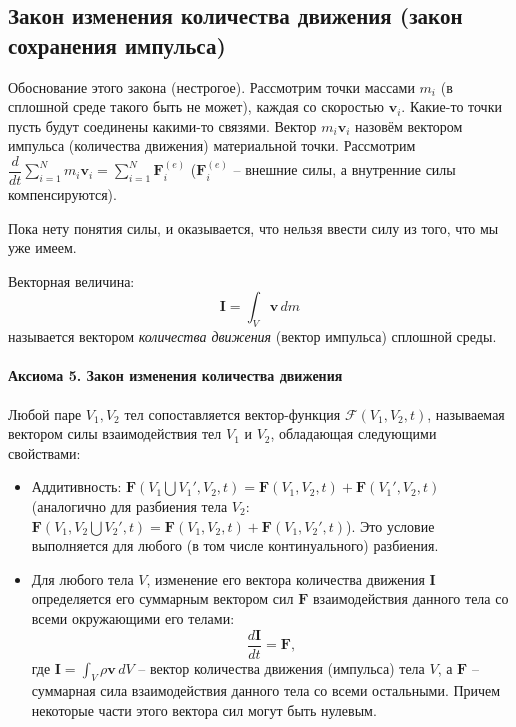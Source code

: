 \subsection{Закон изменения количества движения (закон сохранения импульса)}

Обоснование этого закона (нестрогое). Рассмотрим точки массами $m_i$ (в сплошной среде такого
быть не может), каждая со скоростью $\mathbf{v}_i$. Какие-то точки пусть будут соединены
какими-то связями. Вектор $m_i \mathbf{v}_i$ назовём вектором импульса (количества движения)
материальной точки. Рассмотрим $\dfrac{d}{dt} \sum_{i=1}^N m_i \mathbf{v}_i = \sum_{i=1}^N \mathbf{F}_i^{(e)}$ ($\mathbf{F}_i^{(e)}$ -- внешние силы, а внутренние силы компенсируются).


Пока нету понятия силы, и оказывается, что нельзя ввести силу из того, что мы уже имеем.

\begin{definition}
  Векторная величина:
  \[
    \mathbf{I} = \int_V \mathbf{v} \, dm
  \]
  называется вектором \emph{количества движения} (вектор импульса) сплошной среды.
\end{definition}


\paragraph{Аксиома 5. Закон изменения количества движения}

Любой паре $V_1, V_2$ тел сопоставляется вектор-функция $\mathcal{F}(V_1, V_2, t)$, называемая
вектором силы взаимодействия тел $V_1$ и $V_2$, обладающая следующими свойствами:
\begin{itemize}
  \item Аддитивность: $\mathcal{\mathbf{F}}(V_1 \bigcup V_1', V_2, t)
    = \mathcal{\mathbf{F}}(V_1, V_2, t) + \mathcal{\mathbf{F}}(V_1', V_2, t)$
    (аналогично для разбиения тела $V_2$: $\mathcal{\mathbf{F}} (V_1, V_2\bigcup V_2', t)
    = \mathcal{\mathbf{F}}(V_1, V_2, t) + \mathcal{\mathbf{F}}(V_1, V_2', t)$). Это
    условие выполняется для любого (в том числе континуального) разбиения.

  \item Для любого тела $V$, изменение его вектора количества движения $\mathbf{I}$
    определяется его суммарным вектором сил $\mathcal{\mathbf{F}}$ взаимодействия
    данного тела со всеми окружающими его телами:
    \begin{equation}\label{axiom-5}
      \dfrac{d\mathbf{I}}{dt} = \mathcal{\mathbf{F}},
    \end{equation}
    где $\mathbf{I} = \int_V \rho \mathbf{v} \, dV$ -- вектор количества движения (импульса)
    тела $V$, а $\mathcal{\mathbf{F}}$ -- суммарная сила взаимодействия данного
    тела со всеми остальными.
    Причем некоторые части этого вектора сил могут быть нулевым.
\end{itemize}
